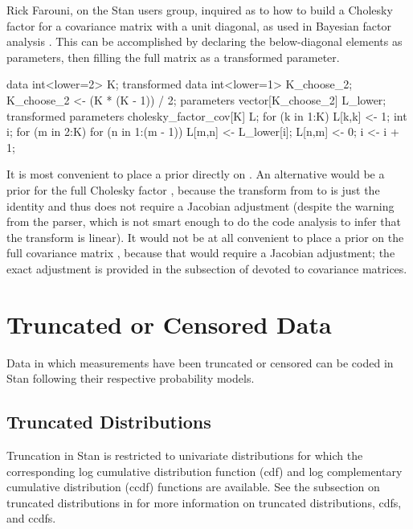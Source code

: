 Rick Farouni, on the Stan users group, inquired as to how to build
a Cholesky factor for a covariance matrix with a unit diagonal, as
used in Bayesian factor analysis \cite{aguilar-west:2000}.  This
can be accomplished by declaring the below-diagonal elements as
parameters, then filling the full matrix as a transformed parameter.
%
\begin{stancode}
data {
  int<lower=2> K;
}
transformed data {
  int<lower=1> K_choose_2;
  K_choose_2 <- (K * (K - 1)) / 2;
}
parameters {
  vector[K_choose_2] L_lower;  
}
transformed parameters {
  cholesky_factor_cov[K] L;
  for (k in 1:K)
    L[k,k] <- 1;
  { 
    int i;
    for (m in 2:K) {
      for (n in 1:(m - 1)) {
        L[m,n] <- L_lower[i];
        L[n,m] <- 0;
        i <- i + 1;
      }
    }
  }
}
\end{stancode}
%
It is most convenient to place a prior directly on .
An alternative would be a prior for the full Cholesky factor ,
because the transform from  to  is just the
identity and thus does not require a Jacobian adjustment (despite the
warning from the parser, which is not smart enough to do the code
analysis to infer that the transform is linear).  It would not be at
all convenient to place a prior on the full covariance matrix , because that would require a Jacobian adjustment; the exact
adjustment is provided in the subsection of
 devoted to covariance matrices.


\chapter{Truncated or Censored Data}

\noindent
Data in which measurements have been truncated or censored can be
coded in Stan following their respective probability models.

\section{Truncated Distributions}

Truncation in Stan is restricted to univariate distributions for which
the corresponding log cumulative distribution function (cdf) and log
complementary cumulative distribution (ccdf) functions are available.
See the subsection on truncated distributions in
 for more information on truncated
distributions, cdfs, and ccdfs.

